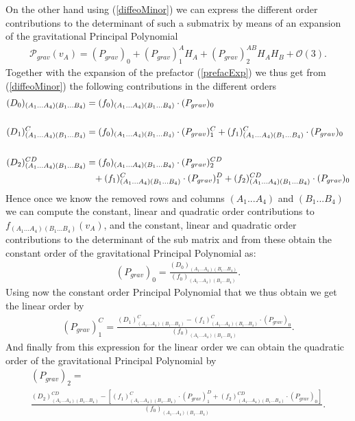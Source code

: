 \documentclass[a4paper,12pt, DIV=14, BCOR=5mm, twoside, headsepline, numbers=noenddot]{scrbook}
\begin{document}
On the other hand using (\ref{diffeoMinor}) we can express the different order contributions to the determinant of such a submatrix by means of an expansion of the gravitational Principal Polynomial
\begin{align}
    \mathcal{P}_{grav}(v_A) = (P_{grav})_{0} + (P_{grav})^A_1 H_A+ (P_{grav})^{AB}_2 H_A H_B +\mathcal{O}(3).
\end{align}
Together with the expansion of the prefactor (\ref{prefacExp}) we thus get from (\ref{diffeoMinor}) the following contributions in the different orders
\begin{align}\label{minorPoly}
    \begin{aligned}
    (D_0)_{(A_1...A_4)(B_1...B_4)}  &= (f_0)_{(A_1...A_4)(B_1...B_4)} \cdot (P_{grav})_0 \\
    \\
    (D_1)^C_{(A_1...A_4)(B_1...B_4)}  &= (f_0)_{(A_1...A_4)(B_1...B_4)} \cdot (P_{grav})^C_1 + (f_1)^C_{(A_1...A_4)(B_1...B_4)} \cdot (P_{grav})_0  \\
    \\
    (D_2)^{CD}_{(A_1...A_4)(B_1...B_4)}  &=  (f_0)_{(A_1...A_4)(B_1...B_4)} \cdot (P_{grav})_2^{CD} \\
     & \hphantom{=} +
     (f_1)^C_{(A_1...A_4)(B_1...B_4)} \cdot (P_{grav})_1^D +(f_2)^{CD}_{(A_1...A_4)(B_1...B_4)} \cdot (P_{grav})_0 
    \end{aligned}
\end{align}
Hence once we know the removed rows and columns $(A_1...A_4)$ and $(B_1...B_4)$ we can compute the constant, linear and quadratic order contributions to $f_{(A_1...A_4)(B_1...B_4)}(v_A)$, and the constant, linear and quadratic order contributions to the determinant of the sub matrix and from these obtain the constant order of the gravitational Principal Polynomial as:
\begin{align}\label{POLY1}
(P_{grav})_0 = \frac{(D_0)_{(A_1...A_4)(B_1...B_4)}}{(f_0)_{(A_1...A_4)(B_1...B_4)}}.
\end{align}
Using now the constant order Principal Polynomial that we thus obtain we get the linear order by
\begin{align}\label{POLY2}
    (P_{grav})^C_1= \frac{(D_1)^C_{(A_1...A_4)(B_1...B_4)} - (f_1)^C_{(A_1...A_4)(B_1...B_4)} \cdot (P_{grav})_0}{(f_0)_{(A_1...A_4)(B_1...B_4)}}.
\end{align}
And finally from this expression for the linear order we can obtain the quadratic order of the gravitational Principal Polynomial by 
\begin{multline}\label{POLY3}
    (P_{grav})_2 = \\
    \frac{(D_2)^{CD}_{(A_1...A_4)(B_1...B_4)}-\left [ (f_1)^C_{(A_1...A_4)(B_1...B_4)} \cdot (P_{grav})^D_1  +(f_2)^{CD}_{(A_1...A_4)(B_1...B_4)} \cdot (P_{grav})_0 \right ]}{(f_0)_{(A_1...A_4)(B_1...B_4)}}.
\end{multline}
\end{document}
